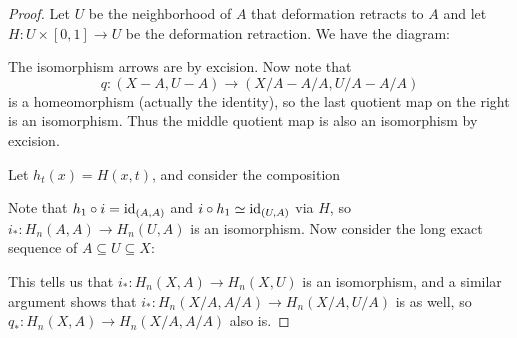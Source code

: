 \begin{proof}
  Let $U$ be the neighborhood of $A$ that deformation
  retracts to $A$ and let $H : U \times [0, 1] \to U$
  be the deformation retraction. We have the
  diagram:
  \begin{center}
  \end{center}
  The isomorphism arrows are by excision. Now note
  that
  \[
    q : (X - A, U - A) \to (X / A - A / A, U / A - A / A)
  \]
  is a homeomorphism (actually the identity), so
  the last quotient map on the right is an isomorphism.
  Thus the middle quotient map is also an isomorphism
  by excision.

  Let $h_t(x) = H(x, t)$, and consider the composition
  \begin{center}
  \end{center}
  Note that $h_1 \circ i = \operatorname{id}_{(A, A)}$ and
  $i \circ h_1 \simeq \operatorname{id}_{(U, A)}$ via $H$, so
  $i_* : H_n(A, A) \to H_n(U, A)$ is an isomorphism.
  Now consider the long exact sequence of
  $A \subseteq U \subseteq X$:
  \begin{center}
  \end{center}
  This tells us that $i_* : H_n(X, A) \to H_n(X, U)$
  is an isomorphism, and a similar argument shows that
  $i_* : H_n(X / A, A / A) \to H_n(X / A, U / A)$
  is as well, so $q_* : H_n(X, A) \to H_n(X / A, A / A)$
  also is.
\end{proof}

